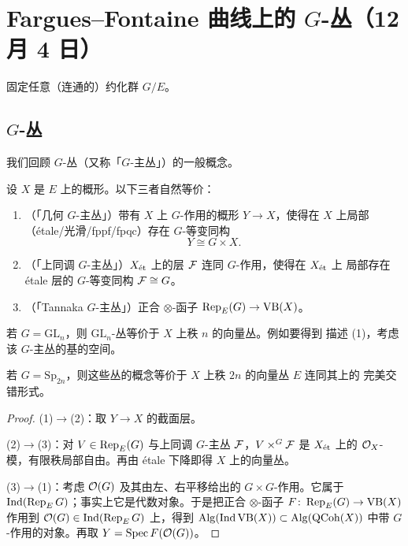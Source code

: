 \section[Fargues--Fontaine 曲线上的 $G$-丛]{Fargues--Fontaine 曲线上的 $G$-丛（12 月 4 日）}

固定任意（连通的）约化群 $G/E$。

\subsection{$G$-丛}

我们回顾 $G$-丛（又称「$G$-主丛」）的一般概念。

\begin{proposition}
设 $X$ 是 $E$ 上的概形。以下三者自然等价：
\begin{enumerate}[label=(\arabic*),itemsep=2pt,topsep=2pt]
\item （「几何 $G$-主丛」）带有 $X$ 上 $G$-作用的概形 $Y\to X$，使得在 $X$ 上局部
（étale/光滑/fppf/fpqc）存在 $G$-等变同构
\[
Y\cong G\times X.
\]
\item （「上同调 $G$-主丛」）$X_\et$ 上的层 $\cF$ 连同 $G$-作用，使得在 $X_\et$ 上
局部存在 étale 层的 $G$-等变同构 $\cF\cong G$。
\item （「Tannaka $G$-主丛」）正合 $\otimes$-函子 $\Rep_E(G)\to\mathrm{VB}(X)$。
\end{enumerate}
\end{proposition}

\begin{example}
若 $G=\mathrm{GL}_n$，则 $\mathrm{GL}_n$-丛等价于 $X$ 上秩 $n$ 的向量丛。例如要得到
描述 (1)，考虑该 $G$-主丛的基的空间。
\end{example}

\begin{example}
若 $G=\mathrm{Sp}_{2n}$，则这些丛的概念等价于 $X$ 上秩 $2n$ 的向量丛 $E$ 连同其上的
完美交错形式。
\end{example}

\begin{proof}
(1)$\to$(2)：取 $Y\to X$ 的截面层。

(2)$\to$(3)：对 $V\in\Rep_E(G)$ 与上同调 $G$-主丛 $\cF$，$V\times^G\cF$ 是 $X_\et$ 上的
$\cO_X$-模，有限秩局部自由。再由 étale 下降即得 $X$ 上的向量丛。

(3)$\to$(1)：考虑 $\cO(G)$ 及其由左、右平移给出的 $G\times G$-作用。它属于
$\Ind(\Rep_E G)$；事实上它是代数对象。于是把正合 $\otimes$-函子
$F\colon\Rep_E(G)\to\mathrm{VB}(X)$ 作用到 $\cO(G)\in\Ind(\Rep_E G)$ 上，得到
$\operatorname{Alg}(\Ind\mathrm{VB}(X))\subset\operatorname{Alg}(\QCoh(X))$ 中带
$G$-作用的对象。再取 $Y=\Spec F(\cO(G))$。
\end{proof}

